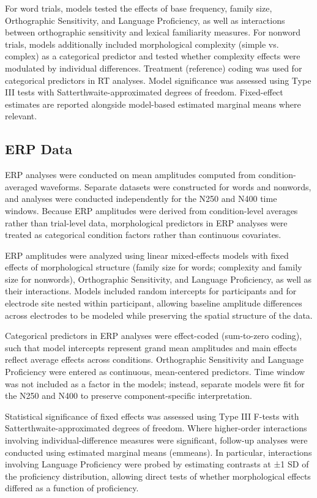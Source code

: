 \documentclass[preprint,12pt, authoryear, review]{elsarticle}
\begin{document}
	For word trials, models tested the effects of base frequency, family size, Orthographic Sensitivity, and Language Proficiency, as well as interactions between orthographic sensitivity and lexical familiarity measures. For nonword trials, models additionally included morphological complexity (simple vs. complex) as a categorical predictor and tested whether complexity effects were modulated by individual differences. Treatment (reference) coding was used for categorical predictors in RT analyses. Model significance was assessed using Type III tests with Satterthwaite-approximated degrees of freedom. Fixed-effect estimates are reported alongside model-based estimated marginal means where relevant.
	
	\subsection{ERP Data}
	ERP analyses were conducted on mean amplitudes computed from condition-averaged waveforms. Separate datasets were constructed for words and nonwords, and analyses were conducted independently for the N250 and N400 time windows. Because ERP amplitudes were derived from condition-level averages rather than trial-level data, morphological predictors in ERP analyses were treated as categorical condition factors rather than continuous covariates.
	
	ERP amplitudes were analyzed using linear mixed-effects models with fixed effects of morphological structure (family size for words; complexity and family size for nonwords), Orthographic Sensitivity, and Language Proficiency, as well as their interactions. Models included random intercepts for participants and for electrode site nested within participant, allowing baseline amplitude differences across electrodes to be modeled while preserving the spatial structure of the data.
	
	Categorical predictors in ERP analyses were effect-coded (sum-to-zero coding), such that model intercepts represent grand mean amplitudes and main effects reflect average effects across conditions. Orthographic Sensitivity and Language Proficiency were entered as continuous, mean-centered predictors. Time window was not included as a factor in the models; instead, separate models were fit for the N250 and N400 to preserve component-specific interpretation.
	
	Statistical significance of fixed effects was assessed using Type III F-tests with Satterthwaite-approximated degrees of freedom. Where higher-order interactions involving individual-difference measures were significant, follow-up analyses were conducted using estimated marginal means (emmeans). In particular, interactions involving Language Proficiency were probed by estimating contrasts at ±1 SD of the proficiency distribution, allowing direct tests of whether morphological effects differed as a function of proficiency.
	
\end{document}
